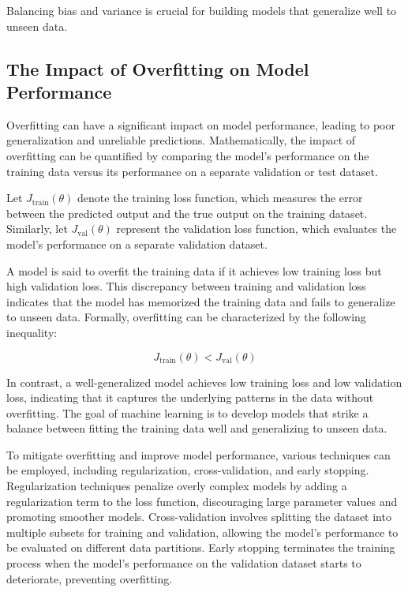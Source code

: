 \documentclass[12pt]{book} %
\begin{document}
Balancing bias and variance is crucial for building models that generalize well to unseen data.

\subsection{The Impact of Overfitting on Model Performance}

Overfitting can have a significant impact on model performance, leading to poor generalization and unreliable predictions. Mathematically, the impact of overfitting can be quantified by comparing the model's performance on the training data versus its performance on a separate validation or test dataset.

Let \( J_{\text{train}}(\theta) \) denote the training loss function, which measures the error between the predicted output and the true output on the training dataset. Similarly, let \( J_{\text{val}}(\theta) \) represent the validation loss function, which evaluates the model's performance on a separate validation dataset.

A model is said to overfit the training data if it achieves low training loss but high validation loss. This discrepancy between training and validation loss indicates that the model has memorized the training data and fails to generalize to unseen data. Formally, overfitting can be characterized by the following inequality:

\[ J_{\text{train}}(\theta) < J_{\text{val}}(\theta) \]

In contrast, a well-generalized model achieves low training loss and low validation loss, indicating that it captures the underlying patterns in the data without overfitting. The goal of machine learning is to develop models that strike a balance between fitting the training data well and generalizing to unseen data.

To mitigate overfitting and improve model performance, various techniques can be employed, including regularization, cross-validation, and early stopping. Regularization techniques penalize overly complex models by adding a regularization term to the loss function, discouraging large parameter values and promoting smoother models. Cross-validation involves splitting the dataset into multiple subsets for training and validation, allowing the model's performance to be evaluated on different data partitions. Early stopping terminates the training process when the model's performance on the validation dataset starts to deteriorate, preventing overfitting.
\end{document}
